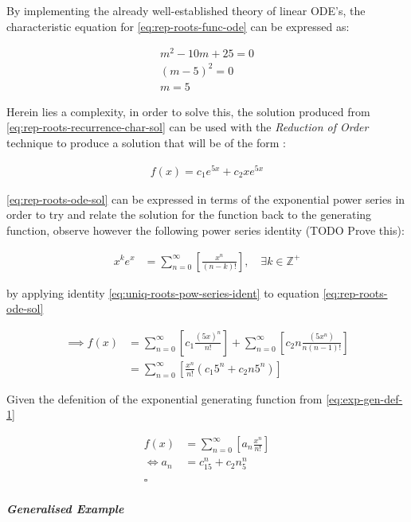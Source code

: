 \documentclass[11pt]{article}
\begin{document}
By implementing the already well-established theory of linear ODE's, the characteristic equation for \eqref{eq:rep-roots-func-ode} can be expressed as:

\begin{align}
    m^2- 10m+  25 = 0 \nonumber \\
    {\left({ m- 5 }\right)}^2 = 0 \nonumber \\
    m= 5 \label{eq:rep-roots-recurrence-char-sol}
\end{align}

Herein lies a complexity, in order to solve this, the solution produced from \eqref{eq:rep-roots-recurrence-char-sol} can be used with the \emph{Reduction of Order} technique to produce a solution that will be of the form :

\begin{align}
    f{\left({ x }\right)}= c_1e^{5x} +  c_2 x e^{5x} \label{eq:rep-roots-ode-sol}
\end{align}

\eqref{eq:rep-roots-ode-sol} can be expressed in terms of the exponential power series in order to try and relate the solution for the function back to the generating function,
observe however the following power series identity (TODO Prove this):

\begin{align}
    x^ke^x &= \sum^{\infty}_{n= 0}   {\left[{ \frac{x^n}{{\left({ n- k }\right)}!} }\right]}, \quad \exists k \in \mathbb{Z}^+ \label{eq:uniq-roots-pow-series-ident}
\end{align}

by applying identity \eqref{eq:uniq-roots-pow-series-ident} to equation \eqref{eq:rep-roots-ode-sol}

\begin{align}
    \implies  f{\left({ x }\right)} &= \sum^{\infty}_{n= 0}   {\left[{ c_1 \frac{{\left({ 5x }\right)}^n}{n!} }\right]}  +  \sum^{\infty}_{n= 0}   {\left[{ c_2 n \frac{{\left({ 5x^n }\right)}}{n{\left({ n-1 }\right)}!} }\right]} \nonumber \\
 &= \sum^{\infty}_{n= 0}   {\left[{ \frac{x^n}{n!} {\left({ c_{1}5^n +  c_2 n 5^n   }\right)} }\right]} \nonumber
\end{align}

Given the defenition of the exponential generating function from \eqref{eq:exp-gen-def-1}

\begin{align}
    f{\left({ x }\right)}&=     \sum^{\infty}_{n= 0}   {\left[{ a_n \frac{x^n}{n!} }\right]} \nonumber \\
    \iff a_n &= c_{15}^n +  c_2n_5^n \nonumber \\ \nonumber
    \ \nonumber \\
    \square \nonumber
\end{align}
\subparagraph{Generalised Example}
\label{sec:org8dde82d}
\end{document}
